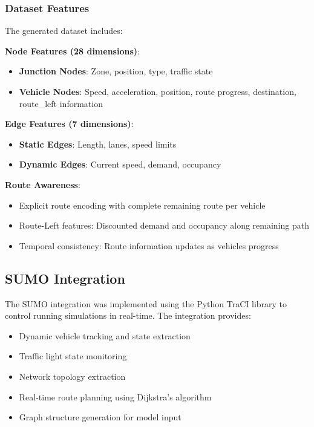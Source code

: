 \subsubsection{Dataset Features}

The generated dataset includes:

\textbf{Node Features (28 dimensions)}:
\begin{itemize}
    \item \textbf{Junction Nodes}: Zone, position, type, traffic state
    \item \textbf{Vehicle Nodes}: Speed, acceleration, position, route progress, destination, route\_left information
\end{itemize}

\textbf{Edge Features (7 dimensions)}:
\begin{itemize}
    \item \textbf{Static Edges}: Length, lanes, speed limits
    \item \textbf{Dynamic Edges}: Current speed, demand, occupancy
\end{itemize}

\textbf{Route Awareness}:
\begin{itemize}
    \item Explicit route encoding with complete remaining route per vehicle
    \item Route-Left features: Discounted demand and occupancy along remaining path
    \item Temporal consistency: Route information updates as vehicles progress
\end{itemize}

\subsection{SUMO Integration}

The SUMO integration was implemented using the Python TraCI library to control running simulations in real-time. The integration provides:

\begin{itemize}
    \item Dynamic vehicle tracking and state extraction
    \item Traffic light state monitoring
    \item Network topology extraction
    \item Real-time route planning using Dijkstra's algorithm
    \item Graph structure generation for model input
\end{itemize}

